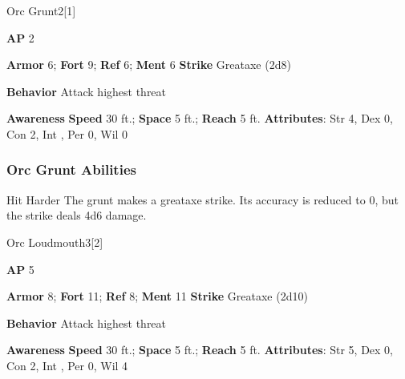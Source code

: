 \begin{monsection}{Orc Grunt}{2}[1]
\vspace{-1em}\vspace{-1em}
\begin{spellcontent}
\begin{spelltargetinginfo}
{\textbf{AP} 2}

\pari \textbf{Armor} 6;
\textbf{Fort} 9;
\textbf{Ref} 6;
\textbf{Ment} 6
\pari \textbf{Strike} Greataxe  (2d8)



\pari \textbf{Behavior} Attack highest threat
\end{spelltargetinginfo}
\end{spellcontent}

\begin{monsterfooter}
\pari \textbf{Awareness} 
\pari \textbf{Speed} 30 ft.;
\textbf{Space} 5 ft.;
\textbf{Reach} 5 ft.
\pari \textbf{Attributes}:
Str 4,
Dex 0,
Con 2,
Int ,
Per 0,
Wil 0
\end{monsterfooter}
\end{monsection}


\subsubsection{Orc Grunt Abilities}

\begin{ability}{Hit Harder}
The grunt makes a greataxe strike.
Its accuracy is reduced to 0, but the strike deals 4d6 damage.
\end{ability}

\begin{monsection}{Orc Loudmouth}{3}[2]
\vspace{-1em}\vspace{-1em}
\begin{spellcontent}
\begin{spelltargetinginfo}
{\textbf{AP} 5}

\pari \textbf{Armor} 8;
\textbf{Fort} 11;
\textbf{Ref} 8;
\textbf{Ment} 11
\pari \textbf{Strike} Greataxe  (2d10)



\pari \textbf{Behavior} Attack highest threat
\end{spelltargetinginfo}
\end{spellcontent}

\begin{monsterfooter}
\pari \textbf{Awareness} 
\pari \textbf{Speed} 30 ft.;
\textbf{Space} 5 ft.;
\textbf{Reach} 5 ft.
\pari \textbf{Attributes}:
Str 5,
Dex 0,
Con 2,
Int ,
Per 0,
Wil 4
\end{monsterfooter}
\end{monsection}


